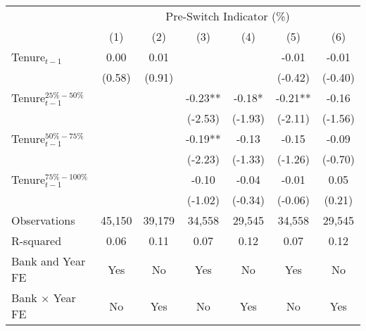 {
\def\sym#1{\ifmmode^{#1}\else\(^{#1}\)\fi}
\begin{tabular*}{\hsize}{@{\hskip\tabcolsep\extracolsep\fill}l*{6}{c}}
\toprule
                &\multicolumn{6}{c}{Pre-Switch Indicator (\%)}                                \\\cmidrule(lr){2-7}
                &\multicolumn{1}{c}{(1)}   &\multicolumn{1}{c}{(2)}   &\multicolumn{1}{c}{(3)}   &\multicolumn{1}{c}{(4)}   &\multicolumn{1}{c}{(5)}   &\multicolumn{1}{c}{(6)}   \\
\midrule
Tenure\(_{t-1}\)&     0.00   &     0.01   &            &            &    -0.01   &    -0.01   \\
                &   (0.58)   &   (0.91)   &            &            &  (-0.42)   &  (-0.40)   \\
 
Tenure\(^{25\%-50\%}_{t-1}\)&            &            &    -0.23** &    -0.18*  &    -0.21** &    -0.16   \\
                &            &            &  (-2.53)   &  (-1.93)   &  (-2.11)   &  (-1.56)   \\
 
Tenure\(^{50\%-75\%}_{t-1}\)&            &            &    -0.19** &    -0.13   &    -0.15   &    -0.09   \\
                &            &            &  (-2.23)   &  (-1.33)   &  (-1.26)   &  (-0.70)   \\
 
Tenure\(^{75\%-100\%}_{t-1}\)&            &            &    -0.10   &    -0.04   &    -0.01   &     0.05   \\
                &            &            &  (-1.02)   &  (-0.34)   &  (-0.06)   &   (0.21)   \\
\midrule
Observations    &   45,150   &   39,179   &   34,558   &   29,545   &   34,558   &   29,545   \\
R-squared       &     0.06   &     0.11   &     0.07   &     0.12   &     0.07   &     0.12   \\
Bank and Year FE&      Yes   &       No   &      Yes   &       No   &      Yes   &       No   \\
Bank $\times$ Year FE&       No   &      Yes   &       No   &      Yes   &       No   &      Yes   \\
\bottomrule
\end{tabular*}
}
